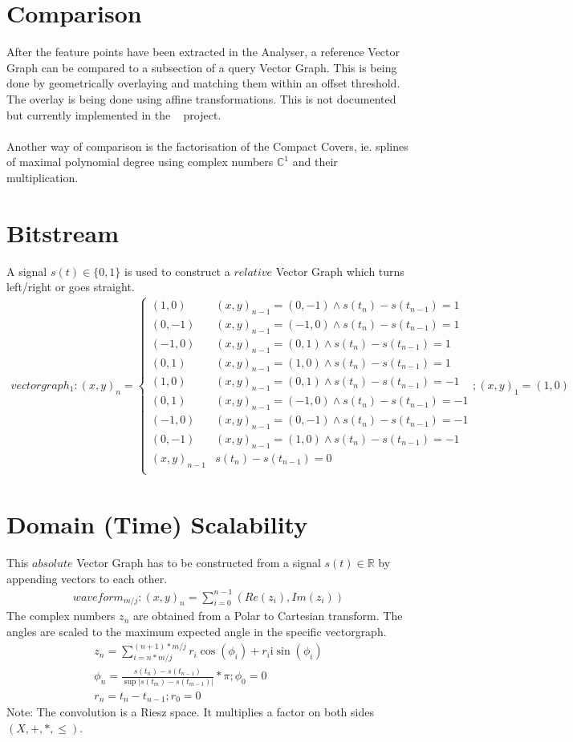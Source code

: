 \documentclass{report}
\begin{document}
\section*{Comparison}
After the feature points have been extracted in the Analyser, a reference Vector Graph can be compared to a subsection of a query Vector Graph. This is being done by geometrically overlaying and matching them within an offset threshold. The overlay is being done using affine transformations. This is not documented but currently implemented in the ~\cite[Stopeight\_Comparator.tex]{Analyzer} project.\\\\
Another way of comparison is the factorisation of the Compact Covers, ie. splines of maximal polynomial degree using complex numbers $\mathbb{C}^1$ and their multiplication.
\section{Bitstream}
A signal $s(t)\in\{0,1\}$ is used to construct a $relative$ Vector Graph which turns left/right or goes straight.
\begin{align}
vectorgraph_{1}: (x,y)_{n}=
\begin{cases}
(1,0) & (x,y)_{n-1}= (0,-1)\land s(t_{n})-s(t_{n-1})=1\\
(0,-1) & (x,y)_{n-1}= (-1,0)\land s(t_{n})-s(t_{n-1})=1\\
(-1,0) & (x,y)_{n-1}= (0,1)\land s(t_{n})-s(t_{n-1})=1\\
(0,1) & (x,y)_{n-1}= (1,0)\land s(t_{n})-s(t_{n-1})=1\\
(1,0) & (x,y)_{n-1}= (0,1)\land s(t_{n})-s(t_{n-1})=-1\\
(0,1) & (x,y)_{n-1}= (-1,0)\land s(t_{n})-s(t_{n-1})=-1\\
(-1,0) & (x,y)_{n-1}= (0,-1)\land s(t_{n})-s(t_{n-1})=-1\\
(0,-1) & (x,y)_{n-1}= (1,0)\land s(t_{n})-s(t_{n-1})=-1\\
(x,y)_{n-1} & s(t_{n})-s(t_{n-1})=0\\
\end{cases};(x,y)_{1}=(1,0)
\end{align}
\section{Domain (Time) Scalability}
This $absolute$ Vector Graph has to be constructed from a signal $s(t)\in \mathbb{R}$ by appending vectors to each other.
\begin{align}
waveform_{m/j}: (x,y)_{n}=\sum \limits _{i=0}^{n-1}(Re(z_{i}),Im(z_{i}))
\end{align}
The complex numbers $z_{n}$ are obtained from a Polar to Cartesian transform. The angles are scaled to the maximum expected angle in the specific vectorgraph.
\begin{align}
z_{n}=\sum \limits _{i=n*m/j}^{(n+1)*m/j}r_{i}\cos(\phi_{i})+r_{i}\mathrm{i}\sin(\phi_{i})\\
\phi_{n}=\frac{s(t_{n})-s(t_{n-1})}{\sup \lvert s(t_{m})-s(t_{m-1}) \rvert}*\pi;\phi_{0}=0\\
r_{n}=t_{n}-t_{n-1};r_{0}=0
\end{align}
Note: The convolution is a Riesz space. It multiplies a factor on both sides $(X,+,*,\leq)$.
\end{document}
